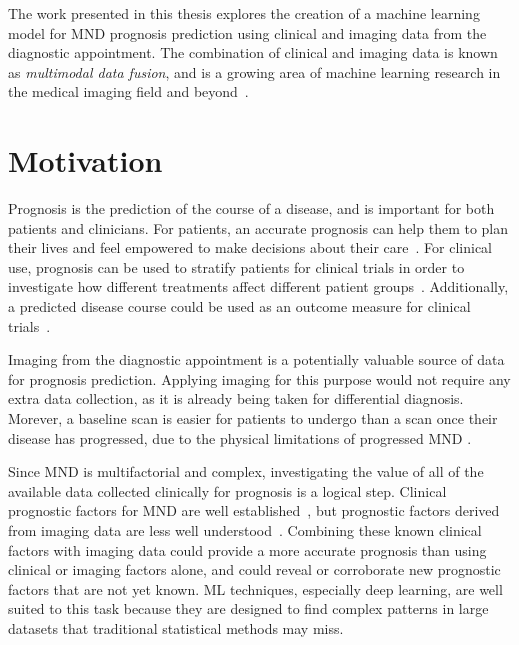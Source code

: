 The work presented in this thesis explores the creation of a machine learning model for MND prognosis prediction using clinical and imaging data from the diagnostic appointment.
The combination of clinical and imaging data is known as \textit{multimodal data fusion}, and is a growing area of machine learning research in the medical imaging field and beyond~\cite{cuiDeepMultimodalFusion2022, mohsenArtificialIntelligencebasedMethods2022}.

\section{Motivation}


Prognosis is the prediction of the course of a disease, and is important for both patients and clinicians.
For patients, an accurate prognosis can help them to plan their lives and feel empowered to make decisions about their care~\cite{talbotClinicalToolPredicting2016, vaneenennaamDiscussingPersonalizedPrognosis2021}.
For clinical use, prognosis can be used to stratify patients for clinical trials in order to investigate how different treatments affect different patient groups~\cite{berryImprovedStratificationALS2018}.
Additionally, a predicted disease course could be used as an outcome measure for clinical trials~\cite{kiernanImprovingClinicalTrial2021}.

Imaging from the diagnostic appointment is a potentially valuable source of data for prognosis prediction.
Applying imaging for this purpose would not require any extra data collection, as it is already being taken for differential diagnosis.
Morever, a baseline scan is easier for patients to undergo than a scan once their disease has progressed, due to the physical limitations of progressed MND .

Since MND is multifactorial and complex, investigating the value of all of the available data collected clinically for prognosis is a logical step.
Clinical prognostic factors for MND are well established~\cite{suPredictorsSurvivalPatients2021}, but prognostic factors derived from imaging data are less well understood~\cite{bedeLessonsALSImaging2014}.
Combining these known clinical factors with imaging data could provide a more accurate prognosis than using clinical or imaging factors alone, and could reveal or corroborate new prognostic factors that are not yet known.
ML techniques, especially deep learning, are well suited to this task because they are designed to find complex patterns in large datasets that traditional statistical methods may miss.

